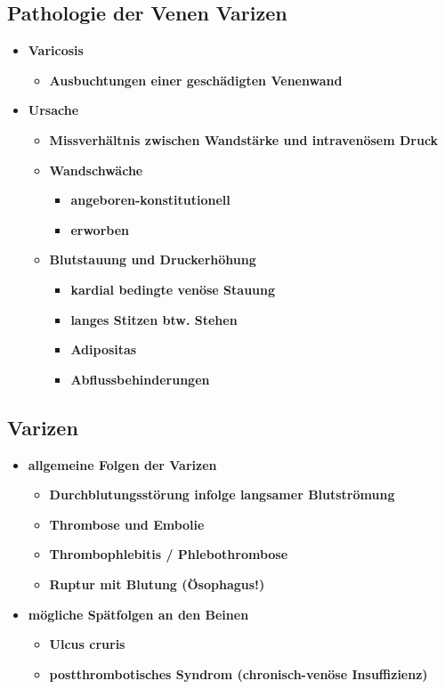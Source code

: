 	\subsection{Pathologie der Venen Varizen}
		\begin{itemize}
			\item \textbf{Varicosis}
				\begin{itemize}
					\item \textbf{Ausbuchtungen einer geschädigten Venenwand}
				\end{itemize}
			\item \textbf{Ursache}
				\begin{itemize}
					\item \textbf{Missverhältnis zwischen Wandstärke und intravenösem Druck}
					\item \textbf{Wandschwäche}
						\begin{itemize}
							\item \textbf{angeboren-konstitutionell}
							\item \textbf{erworben}
						\end{itemize}
					\item \textbf{Blutstauung und Druckerhöhung}
						\begin{itemize}
							\item \textbf{kardial bedingte venöse Stauung}
							\item \textbf{langes Stitzen btw. Stehen}
							\item \textbf{Adipositas}
							\item \textbf{Abflussbehinderungen}
						\end{itemize}
			\end{itemize}
		\end{itemize}
	\subsection{Varizen}
		\begin{itemize}
			\item \textbf{allgemeine Folgen der Varizen}
				\begin{itemize}
					\item \textbf{Durchblutungsstörung infolge langsamer Blutströmung}
					\item \textbf{Thrombose und Embolie}
					\item \textbf{Thrombophlebitis / Phlebothrombose}
					\item \textbf{Ruptur mit Blutung (Ösophagus!)}
				\end{itemize}
			\item \textbf{mögliche Spätfolgen an den Beinen}
				\begin{itemize}
					\item \textbf{Ulcus cruris}
					\item \textbf{postthrombotisches Syndrom (chronisch-venöse Insuffizienz)}
			\end{itemize}
		\end{itemize}
